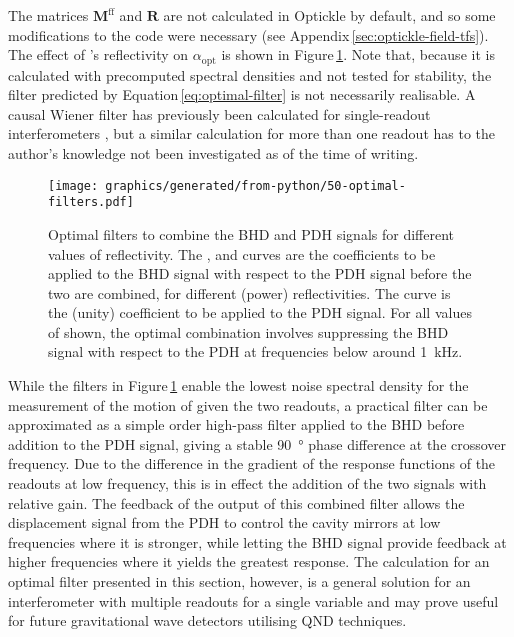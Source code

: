 The matrices $\mathbf{M}^{\textrm{ff}}$ and $\mathbf{R}$ are not calculated in Optickle by default, and so some modifications to the code were necessary (see Appendix\,\ref{sec:optickle-field-tfs}). The effect of \MNINE{}'s reflectivity on $\alpha_{\textrm{opt}}$ is shown in Figure\,\ref{fig:optimal-filters}. Note that, because it is calculated with precomputed spectral densities and not tested for stability, the filter predicted by Equation\,\ref{eq:optimal-filter} is not necessarily realisable. A causal Wiener filter has previously been calculated for single-readout interferometers \cite{MuellerEbhardt2009, Miao2010}, but a similar calculation for more than one readout has to the author's knowledge not been investigated as of the time of writing.

\begin{figure}
  \texttt{[image: graphics/generated/from-python/50-optimal-filters.pdf]}
  \caption[Optimal filters to combine the balanced homodyne and Pound-Drever-Hall signals for different values of \MNINE{} reflectivity]{\label{fig:optimal-filters}Optimal filters to combine the \gls{BHD} and \gls{PDH} signals for different values of \MNINE{} reflectivity. The ,  and  curves are the coefficients to be applied to the \gls{BHD} signal with respect to the \gls{PDH} signal before the two are combined, for different \MNINE{} (power) reflectivities. The  curve is the (unity) coefficient to be applied to the \gls{PDH} signal. For all values of \MNINE{} shown, the optimal combination involves suppressing the \gls{BHD} signal with respect to the \gls{PDH} at frequencies below around \SI{1}{\kilo\hertz}.}
\end{figure}

While the filters in Figure\,\ref{fig:optimal-filters} enable the lowest noise spectral density for the measurement of the motion of \LMINUS{} given the two readouts, a practical filter can be approximated as a simple  order high-pass filter applied to the \gls{BHD} before addition to the \gls{PDH} signal, giving a stable \SI{90}{\degree} phase difference at the crossover frequency. Due to the difference in the gradient of the response functions of the readouts at low frequency, this is in effect the addition of the two signals with relative gain. The feedback of the output of this combined filter allows the displacement signal from the \gls{PDH} to control the cavity mirrors at low frequencies where it is stronger, while letting the \gls{BHD} signal provide feedback at higher frequencies where it yields the greatest response. The calculation for an optimal filter presented in this section, however, is a general solution for an interferometer with multiple readouts for a single variable and may prove useful for future gravitational wave detectors utilising \gls{QND} techniques.

